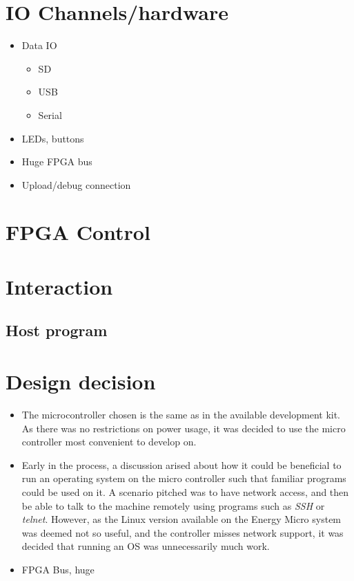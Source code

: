 
\section{IO Channels/hardware}
\begin{itemize}
    \item Data IO
    \begin{itemize}
        \item SD
        \item USB
        \item Serial
    \end{itemize}
    \item LEDs, buttons
    \item Huge FPGA bus
    \item Upload/debug connection
\end{itemize}

\section{FPGA Control}

\section{Interaction}
\subsection{Host program}

\section{Design decision}
\begin{itemize}
    \item The microcontroller chosen is the same as in the available development kit. As there was no restrictions on power usage, 
          it was decided to use the micro controller most convenient to develop on.
    \item Early in the process, a discussion arised about how it could be beneficial to run an operating system on the micro controller
          such that familiar programs could be used on it. A scenario pitched was to have network access, and then be able to talk to the
          machine remotely using programs such as \textit{SSH} or \textit{telnet}. However, as the Linux version available on the Energy Micro
          system was deemed not so useful, and the controller misses network support, it was decided that running an OS was unnecessarily much work.
    \item FPGA Bus, huge
\end{itemize}

